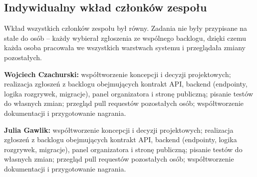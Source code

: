 \documentclass[11pt,a4paper,oneside]{article}
\newif\ifpodpowiedzi
\newcommand{\podpowiedz}[1]{\ifpodpowiedzi\par\begingroup\small\color{hintcolor}\textit{Wskazówka: #1}\par\endgroup\fi}
\newif\iftrzeciaosoba
\newcommand{\studentA}{Wojciech Czachurski}
\newcommand{\studentB}{Julia Gawlik}
\newcommand{\studentC}{Dawid Pątko}
\begin{document}
\subsection{Indywidualny wkład członków zespołu}
\podpowiedz{Dla każdej osoby opisz konkretne zadania i rezultaty. Przy pracy wspólnej rozróżnij indywidualne obowiązki. Uwzględnij również koncepcję, integrację, testy, dokumentację i organizację pracy. Opis powinien być zgodny z raportami i oświadczeniem o wkładzie.}
Wkład wszystkich członków zespołu był równy. Zadania nie były przypisane na stałe do osób -- każdy wybierał zgłoszenia ze wspólnego backlogu, dzięki czemu każda osoba pracowała we wszystkich warstwach systemu i przeglądała zmiany pozostałych.

\textbf{\studentA:} współtworzenie koncepcji i decyzji projektowych; realizacja zgłoszeń z backlogu obejmujących kontrakt API, backend (endpointy, logika rozgrywek, migracje), panel organizatora i stronę publiczną; pisanie testów do własnych zmian; przegląd pull requestów pozostałych osób; współtworzenie dokumentacji i przygotowanie nagrania.\par
\textbf{\studentB:} współtworzenie koncepcji i decyzji projektowych; realizacja zgłoszeń z backlogu obejmujących kontrakt API, backend (endpointy, logika rozgrywek, migracje), panel organizatora i stronę publiczną; pisanie testów do własnych zmian; przegląd pull requestów pozostałych osób; współtworzenie dokumentacji i przygotowanie nagrania.\par
\iftrzeciaosoba
\textbf{\studentC:} współtworzenie koncepcji i decyzji projektowych; realizacja zgłoszeń z backlogu obejmujących kontrakt API, backend (endpointy, logika rozgrywek, migracje), panel organizatora i stronę publiczną; pisanie testów do własnych zmian; przegląd pull requestów pozostałych osób; współtworzenie dokumentacji i przygotowanie nagrania.\par
\fi
\end{document}
